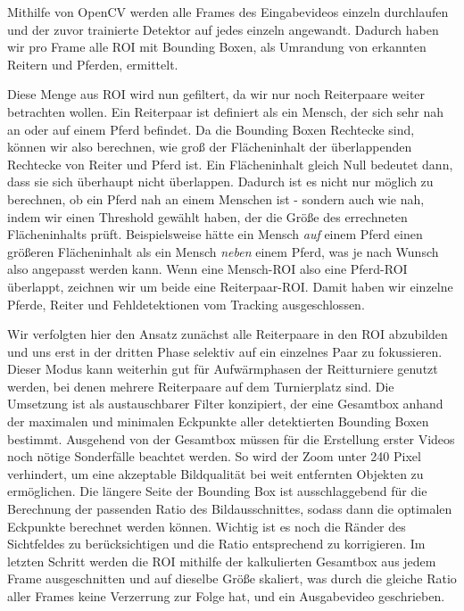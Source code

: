 Mithilfe von OpenCV werden alle Frames des Eingabevideos einzeln durchlaufen und der zuvor trainierte Detektor auf jedes einzeln angewandt. Dadurch haben wir pro Frame alle ROI mit Bounding Boxen, als Umrandung von erkannten Reitern und Pferden, ermittelt. 

Diese Menge aus ROI wird nun gefiltert, da wir nur noch Reiterpaare weiter betrachten wollen. Ein Reiterpaar ist definiert als ein Mensch, der sich sehr nah an oder auf einem Pferd befindet.
Da die Bounding Boxen Rechtecke sind, können wir also berechnen, wie groß der Flächeninhalt der überlappenden Rechtecke von Reiter und Pferd ist. Ein Flächeninhalt gleich Null bedeutet dann, dass sie sich überhaupt nicht überlappen.
Dadurch ist es nicht nur möglich zu berechnen, ob ein Pferd nah an einem Menschen ist - sondern auch wie nah, indem wir einen Threshold gewählt haben, der die Größe des errechneten Flächeninhalts prüft. Beispielsweise hätte ein Mensch \emph{auf} einem Pferd einen größeren Flächeninhalt als ein Mensch \emph{neben} einem Pferd, was je nach Wunsch also angepasst werden kann.
Wenn eine Mensch-ROI also eine Pferd-ROI überlappt, zeichnen wir um beide eine Reiterpaar-ROI. Damit haben wir einzelne Pferde, Reiter und Fehldetektionen vom Tracking ausgeschlossen.

Wir verfolgten hier den Ansatz zunächst alle Reiterpaare in den ROI abzubilden und uns erst in der dritten Phase selektiv auf ein einzelnes Paar zu fokussieren. Dieser Modus kann weiterhin gut für Aufwärmphasen der Reitturniere genutzt werden, bei denen mehrere Reiterpaare auf dem Turnierplatz sind. Die Umsetzung ist als austauschbarer Filter konzipiert, der eine Gesamtbox anhand der maximalen und minimalen Eckpunkte aller detektierten Bounding Boxen bestimmt.
Ausgehend von der Gesamtbox müssen für die Erstellung erster Videos noch nötige Sonderfälle beachtet werden. So wird der Zoom unter 240 Pixel verhindert, um eine akzeptable Bildqualität bei weit entfernten Objekten zu ermöglichen. Die längere Seite der Bounding Box ist ausschlaggebend für die Berechnung der passenden Ratio des Bildausschnittes, sodass dann die optimalen Eckpunkte berechnet werden können. Wichtig ist es noch die Ränder des Sichtfeldes zu berücksichtigen und die Ratio entsprechend zu korrigieren.
Im letzten Schritt werden die ROI mithilfe der kalkulierten Gesamtbox aus jedem Frame ausgeschnitten und auf dieselbe  Größe skaliert, was durch die gleiche Ratio aller Frames keine Verzerrung zur Folge hat, und ein Ausgabevideo geschrieben.






